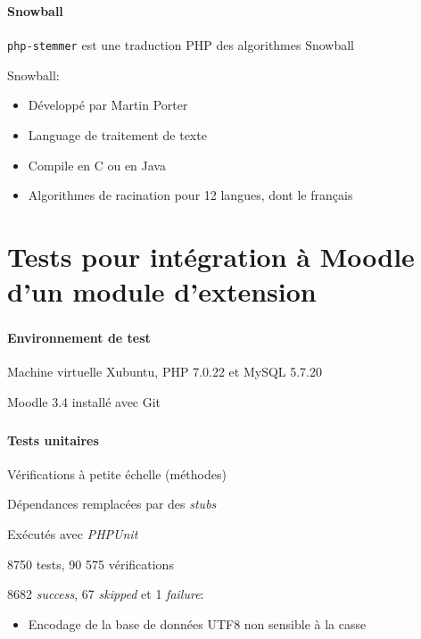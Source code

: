 \documentclass{beamer}
\begin{document}
  \begin{frame}
  \frametitle{\insertsection}
  \framesubtitle{Snowball}
  \texttt{php-stemmer} est une traduction PHP des algorithmes Snowball
  
  \bigskip
  
  Snowball:
  \begin{itemize}
    \item D\'evelopp\'e par Martin Porter
    \item Language de traitement de texte
    \item Compile en C ou en Java
    \item Algorithmes de racination pour 12 langues, dont le fran\c{c}ais
  \end{itemize}
  \end{frame}
  
  \section[Tests]{Tests pour int\'egration \`a Moodle d'un module d'extension}
  \begin{frame}
  \frametitle{\insertsection}
  \framesubtitle{Environnement de test}
  Machine virtuelle Xubuntu, PHP 7.0.22 et MySQL 5.7.20
  
  Moodle 3.4 install\'e avec Git
  \end{frame}
  
  \begin{frame}
  \frametitle{\insertsection}
  \framesubtitle{Tests unitaires}
  V\'erifications \`a petite \'echelle (m\'ethodes)
  
  D\'ependances remplac\'ees par des \textit{stubs}
  
  Ex\'ecut\'es avec \textit{PHPUnit}
  
  \bigskip
  
  8750 tests, 90 575 v\'erifications
  
  8682 \textit{success}, 67 \textit{skipped} et 1 \textit{failure}:
  \begin{itemize}
    \item Encodage de la base de donn\'ees UTF8 non sensible \`a la casse
  \end{itemize}
  \end{frame}
  
\end{document}
